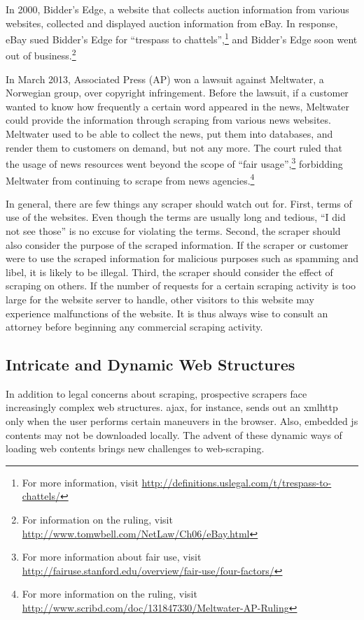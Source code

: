 \documentclass[12pt]{report}
\begin{document}
In 2000, Bidder's Edge, a website that collects auction information from various websites, collected and displayed auction information from eBay. In response, eBay sued Bidder's Edge for ``trespass to chattels'',\footnote{For more information, visit \url{http://definitions.uslegal.com/t/trespass-to-chattels/}} and Bidder's Edge soon went out of business.\footnote{For information on the ruling, visit \url{http://www.tomwbell.com/NetLaw/Ch06/eBay.html}}

In March 2013, Associated Press (AP) won a lawsuit against Meltwater, a Norwegian group, over copyright infringement. Before the lawsuit, if a customer wanted to know how frequently a certain word appeared in the news, Meltwater could provide the information through scraping from various news websites. Meltwater used to be able to collect the news, put them into databases, and render them to customers on demand, but not any more. The court ruled that the usage of news resources went beyond the scope of ``fair usage'',\footnote{For more information about fair use, visit \url{http://fairuse.stanford.edu/overview/fair-use/four-factors/}} forbidding Meltwater from continuing to scrape from news agencies.\footnote{For more information on the ruling, visit \url{http://www.scribd.com/doc/131847330/Meltwater-AP-Ruling}}

In general, there are few things any scraper should watch out for. First, terms of use of the websites. Even though the terms are usually long and tedious, ``I did not see those'' is no excuse for violating the terms. Second, the scraper should also consider the purpose of the scraped information. If the scraper or customer were to use the scraped information for malicious purposes such as spamming and libel, it is likely to be illegal. Third, the scraper should consider the effect of scraping on others. If the number of requests for a certain scraping activity is too large for the website server to handle, other visitors to this website may experience malfunctions of the website. It is thus always wise to consult an attorney before beginning any commercial scraping activity.

\subsection{Intricate and Dynamic Web Structures}

In addition to legal concerns about scraping, prospective scrapers face increasingly complex web structures. \gls{ajax}, for instance, sends out an \gls{xmlhttp} only when the user performs certain maneuvers in the browser. Also, embedded \gls{js} contents may not be downloaded locally. The advent of these dynamic ways of loading web contents brings new challenges to web-scraping.
\end{document}
